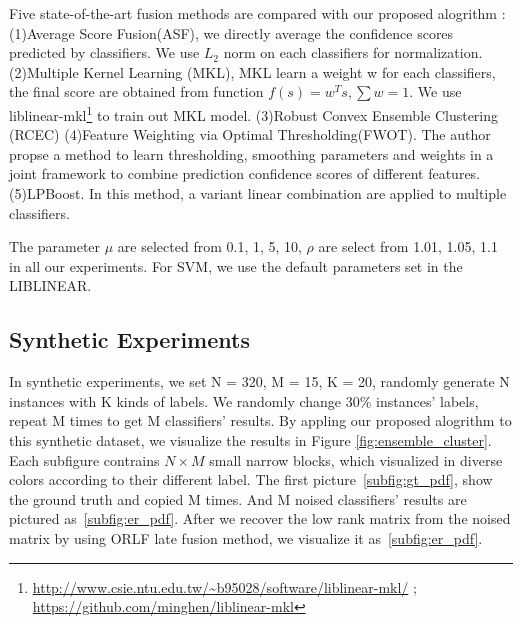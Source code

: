 \documentclass[letterpaper]{article}
\begin{document}
Five state-of-the-art fusion methods are compared with our proposed alogrithm : (1)Average Score Fusion(ASF), we directly average the confidence scores predicted by classifiers. We use $L_2$ norm on each classifiers for normalization. (2)Multiple Kernel Learning (MKL),  MKL learn a weight w for each classifiers, the final score are obtained from function $f(s)=w^{T}s, \sum w = 1$. We use liblinear-mkl\footnote{\url{http://www.csie.ntu.edu.tw/~b95028/software/liblinear-mkl/} ; \url{https://github.com/minghen/liblinear-mkl}} to train out MKL model. (3)Robust Convex Ensemble Clustering (RCEC)\cite{gaoijcai2016robust} (4)Feature Weighting via Optimal Thresholding(FWOT)\cite{xuiccv2013feature}. The author propse a method to learn thresholding, smoothing parameters and weights in a joint framework to combine prediction confidence scores of different features. (5)LPBoost\cite{gehler2009feature}. In this method, a variant linear combination are applied to multiple classifiers.

The parameter $\mu$ are selected from {0.1, 1, 5, 10}, $\rho$ are select from {1.01, 1.05, 1.1} in all our experiments. For SVM, we use the default parameters set in the LIBLINEAR.

\subsection{Synthetic Experiments}

In synthetic experiments, we set N = 320, M = 15, K = 20, randomly generate N instances with K kinds of labels. We randomly change 30\% instances' labels, repeat M times to get M classifiers' results. By appling our proposed alogrithm to this synthetic dataset, we visualize the results in Figure \ref{fig:ensemble_cluster}. Each subfigure contrains $N\times M$ small narrow blocks, which visualized in diverse colors according to their different label. The first picture~\ref{subfig:gt_pdf}, show the ground truth and copied M times. And M noised classifiers' results are pictured as~\ref{subfig:er_pdf}. After we recover the low rank matrix from the noised matrix by using ORLF late fusion method, we visualize it as~\ref{subfig:er_pdf}.
\end{document}
